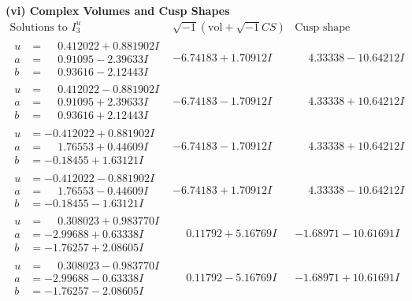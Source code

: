 \documentclass[1p]{elsarticle_modified}
\theoremstyle{definition}
\newcommand{\I}{\sqrt{-1}}
\begin{document}
\newpage\flushleft \textbf{(vi) Complex Volumes and Cusp Shapes}
$$\begin{array}{c|c|c}  
\text{Solutions to }I^u_{3}& \I (\text{vol} + \sqrt{-1}CS) & \text{Cusp shape}\\
 \hline 
\begin{aligned}
u &= \phantom{-}0.412022 + 0.881902 I \\
a &= \phantom{-}0.91095 - 2.39633 I \\
b &= \phantom{-}0.93616 - 2.12443 I\end{aligned}
 & -6.74183 + 1.70912 I & \phantom{-}4.33338 - 10.64212 I \\ \hline\begin{aligned}
u &= \phantom{-}0.412022 - 0.881902 I \\
a &= \phantom{-}0.91095 + 2.39633 I \\
b &= \phantom{-}0.93616 + 2.12443 I\end{aligned}
 & -6.74183 - 1.70912 I & \phantom{-}4.33338 + 10.64212 I \\ \hline\begin{aligned}
u &= -0.412022 + 0.881902 I \\
a &= \phantom{-}1.76553 + 0.44609 I \\
b &= -0.18455 + 1.63121 I\end{aligned}
 & -6.74183 - 1.70912 I & \phantom{-}4.33338 + 10.64212 I \\ \hline\begin{aligned}
u &= -0.412022 - 0.881902 I \\
a &= \phantom{-}1.76553 - 0.44609 I \\
b &= -0.18455 - 1.63121 I\end{aligned}
 & -6.74183 + 1.70912 I & \phantom{-}4.33338 - 10.64212 I \\ \hline\begin{aligned}
u &= \phantom{-}0.308023 + 0.983770 I \\
a &= -2.99688 + 0.63338 I \\
b &= -1.76257 + 2.08605 I\end{aligned}
 & \phantom{-}0.11792 + 5.16769 I & -1.68971 - 10.61691 I \\ \hline\begin{aligned}
u &= \phantom{-}0.308023 - 0.983770 I \\
a &= -2.99688 - 0.63338 I \\
b &= -1.76257 - 2.08605 I\end{aligned}
 & \phantom{-}0.11792 - 5.16769 I & -1.68971 + 10.61691 I \\ \hline\begin{aligned}

\end{aligned}
\end{array}$$
\end{document}

